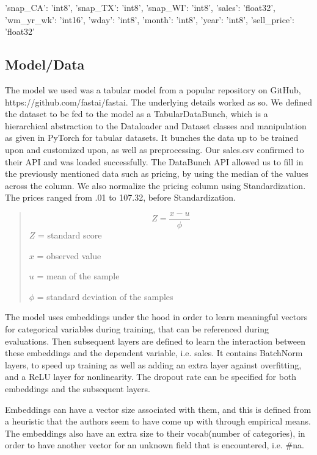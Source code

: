 \documentclass[10pt,twocolumn,letterpaper]{article}
\begin{document}
 'snap\_CA': 'int8', 'snap\_TX': 'int8', 'snap\_WI': 'int8', 'sales': 'float32',
 'wm\_yr\_wk': 'int16', 'wday': 'int8', 'month': 'int8', 'year': 'int8',
 'sell\_price': 'float32'

\subsection{Model/Data}
The model we used was a tabular model from a popular repository on GitHub,
https://github.com/fastai/fastai. The underlying details worked as so. We
defined the dataset to be fed to the model as a TabularDataBunch, which is a
hierarchical abstraction to the Dataloader and Dataset classes and manipulation
as given in PyTorch for tabular datasets. It bunches the data up to be trained
upon and customized upon, as well as preprocessing. Our sales.csv confirmed to
their API and was loaded successfully. The DataBunch API allowed us to fill in
the previously mentioned data such as pricing, by using the median of the values
across the column. We also normalize the pricing column using Standardization.
The prices ranged from .01 to 107.32, before Standardization.

\begin{quote}
  \begin{equation}
    Z=\frac{x-u}{\phi}
    \label{newEquatation}
  \end{equation}
  $Z$ = standard score

  $x$ = observed value

  $u$ = mean of the sample

  $\phi$ = standard deviation of the samples
\end{quote}

  The model uses embeddings under the hood in order to learn meaningful vectors
  for categorical variables during training, that can be referenced during
  evaluations. Then subsequent layers are defined to learn the interaction
  between these embeddings and the dependent variable, i.e. sales. It contains
  BatchNorm layers, to speed up training as well as adding an extra layer
  against overfitting, and a ReLU layer for nonlinearity. The dropout rate can
  be specified for both embeddings and the subsequent layers.

  Embeddings can have a vector size associated with them, and this is defined
  from a heuristic that the authors seem to have come up with through empirical
  means. The embeddings also have an extra size to their vocab(number of
  categories), in order to have another vector for an unknown field that is
  encountered, i.e. \#na.
\end{document}
